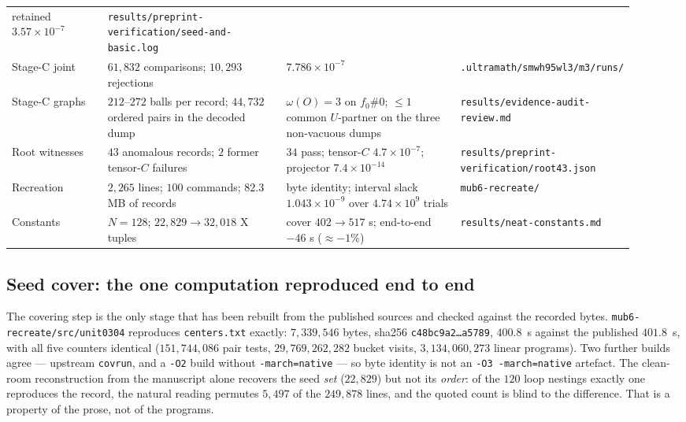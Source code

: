 \documentclass[10pt]{article}
\theoremstyle{definition}
\newcommand{\file}[1]{\texttt{\small #1}}
\begin{document}
\begin{center}
\begin{longtable}{@{}L{0.16\linewidth}L{0.30\linewidth}L{0.30\linewidth}L{0.16\linewidth}@{}}
retained $3.57\times10^{-7}$ & \file{results/\allowbreak{}preprint-\allowbreak{}verification/\allowbreak{}seed-\allowbreak{}and-\allowbreak{}basic.log} \\
Stage-C joint & $61{,}832$ comparisons; $10{,}293$ rejections & $7.786\times10^{-7}$ &
\file{.ultramath/\allowbreak{}smwh95wl3/\allowbreak{}m3/\allowbreak{}runs/\allowbreak{}} \\
Stage-C graphs & $212$--$272$ balls per record; $44{,}732$ ordered pairs in the decoded dump &
$\omega(O)=3$ on $f_0\#0$; $\le1$ common $U$-partner on the three non-vacuous dumps &
\file{results/\allowbreak{}evidence-\allowbreak{}audit-\allowbreak{}review.md} \\
Root witnesses & $43$ anomalous records; $2$ former tensor-$C$ failures & $34$ pass; tensor-$C$
$4.7\times10^{-7}$; projector $7.4\times10^{-14}$ & \file{results/\allowbreak{}preprint-\allowbreak{}verification/\allowbreak{}root43.json} \\
Recreation & $2{,}265$ lines; $100$ commands; $82.3$ MB of records & byte identity; interval slack
$1.043\times10^{-9}$ over $4.74\times10^{9}$ trials & \file{mub6-\allowbreak{}recreate/\allowbreak{}} \\
Constants & $N=128$; $22{,}829\to32{,}018$ X tuples & cover $402\to517$ s; end-to-end $-46$ s
($\approx-1\%$) & \file{results/\allowbreak{}neat-\allowbreak{}constants.md} \\
\bottomrule
\end{longtable}
\end{center}

\subsection{Seed cover: the one computation reproduced end to end}
The covering step is the only stage that has been rebuilt from the published sources and checked
against the recorded bytes. \file{mub6-\allowbreak{}recreate/\allowbreak{}src/\allowbreak{}unit0304} reproduces \file{centers.txt} exactly:
$7{,}339{,}546$ bytes, sha256 \texttt{c48bc9a2\ldots a5789}, $400.8$~s against the published
$401.8$~s, with all five counters identical ($151{,}744{,}086$ pair tests, $29{,}769{,}262{,}282$
bucket visits, $3{,}134{,}060{,}273$ linear programs). Two further builds agree --- upstream
\file{covrun}, and a \texttt{-O2} build without \texttt{-march=native} --- so byte identity is not an
\texttt{-O3 -march=native} artefact. The clean-room reconstruction from the manuscript alone recovers
the seed \emph{set} ($22{,}829$) but not its \emph{order}: of the $120$ loop nestings exactly one
reproduces the record, the natural reading permutes $5{,}497$ of the $249{,}878$ lines, and the
quoted count is blind to the difference. That is a property of the prose, not of the programs.
\end{document}
